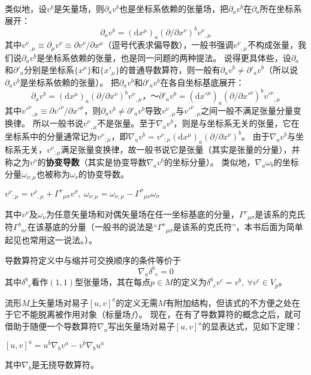 类似地，设$v^b$是矢量场，则$\partial_av^b$也是坐标系依赖的张量场，把$\partial_av^b$在$\partial_a$所在坐标系展开：
$$\partial_av^b = (\mathrm{d}x^\mu)_a(\partial / \partial x^\nu)^bv^\nu{}_{,\mu}$$
其中$v^\nu{}_{,\mu} \equiv \partial_\mu v^\nu \equiv \partial v^\nu / \partial x^\mu$（逗号代表求偏导数），一般书强调$v^\nu{}_{,\mu}$不构成张量，我们说$\partial_av^b$是坐标系依赖的张量，也是同一问题的两种提法。
说得更具体些，设$\partial_a$和$\partial'_a$分别是坐标系$\{x^\mu\}$和$\{x'_\mu\}$的普通导数算符，则一般有$\partial_av^b \neq \partial'_av^b$（所以说$\partial_av^b$是坐标系依赖的张量）。
把$\partial_av^b$和$\partial'_av^b$在各自坐标基底展开：
$$\partial_av^b = (\mathrm{d}x^\mu)_a(\partial / \partial x^\nu)^bv^\nu{}_{,\mu}， ～ \partial'_av^b = (\mathrm{d}x'^\mu)_a(\partial / \partial x'^\nu)^bv'^\nu{}_{,\mu}$$
其中$v'^\nu{}_{,\mu} \equiv \partial v'^\nu / \partial x'^\mu$，则$\partial_av^b \neq \partial'_av^b$导致$v^\nu{}_{,\mu}$与$v'^\nu{}_{,\mu}$之间一般不满足张量分量变换律。
所以一般书说$v^\nu{}_{,\mu}$不是张量。至于$\nabla_av^b$，则是与坐标系无关的张量，它在坐标系中的分量通常记为$v^\nu{}_{;\mu}$，即$\nabla_av^b = v^\nu{}_{;\mu}(\mathrm{d}x^\mu)_a(\partial / \partial x^\nu)^b$。
由于$\nabla_av^b$与坐标系无关，$v^\nu{}_{;\mu}$满足张量变换律，故一般书说它是张量（其实是张量的分量），并称之为$v^\nu$的\textbf{协变导数}（其实是协变导数$\nabla_av^b$的坐标分量）。
类似地，$\nabla_a\omega_b$的坐标分量$\omega_{\nu;\mu}$也被称为$\omega_\nu$的协变导数。

\begin{theorem}
$v^\nu{}_{;\mu} = v^\nu{}_{,\mu} + \Gamma^\nu{}_{\mu\sigma}v^\sigma, ~ \omega_{\nu;\mu} = \omega_{\nu,\mu} - \Gamma^\sigma{}_{\mu\nu}\omega_\sigma$

其中$v^\nu$及$\omega_\nu$为任意矢量场和对偶矢量场在任一坐标基底的分量，$\Gamma^\nu{}_{\mu\sigma}$是该系的克氏符$\Gamma^b{}_{ac}$在该基底的分量（一般书的说法是``$\Gamma^\nu{}_{\mu\sigma}$是该系的克氏符''，本书后面为简单起见也常用这一说法。）。
\end{theorem}

\begin{theorem}
导数算符定义中与缩并可交换顺序的条件等价于
$$\nabla_a\delta^b{}_c = 0$$
其中$\delta^b{}_c$看作$(1, 1)$型张量场，其在每点$p \in M$的定义为$\delta^b{}_cv^c = v^b, ~ \forall v^c \in V_p$。
\end{theorem}

流形$M$上矢量场对易子$[u, v]^a$的定义无需$M$有附加结构，但该式的不方便之处在于它不能脱离被作用对象（标量场$f$）。
现在，在有了导数算符的概念之后，就可借助于随便一个导数算符$\nabla_a$写出矢量场对易子$[u, v]^a$的显表达式，见如下定理：
\begin{theorem}
$[u, v]^a = u^b\nabla_bv^a - v^b\nabla_bu^a$

其中$\nabla_b$是无挠导数算符。
\end{theorem}

